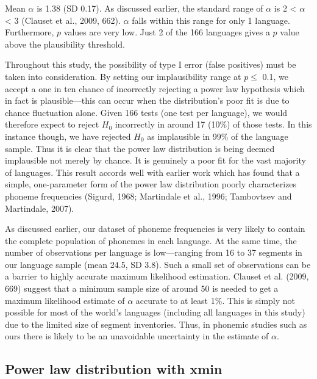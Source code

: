 Mean \(\alpha\) is 1.38 (SD 0.17). As discussed earlier, the standard range of \(\alpha\) is 2 \textless{} \(\alpha\) \textless{} 3 (Clauset et al., 2009, 662). \(\alpha\) falls within this range for only 1 language. Furthermore, \(p\) values are very low. Just 2 of the 166 languages gives a \(p\) value above the plausibility threshold.

Throughout this study, the possibility of type I error (false positives) must be taken into consideration. By setting our implausibility range at \(p \leq\) 0.1, we accept a one in ten chance of incorrectly rejecting a power law hypothesis which in fact is plausible---this can occur when the distribution's poor fit is due to chance fluctuation alone. Given 166 tests (one test per language), we would therefore expect to reject \(H_0\) incorrectly in around 17 (10\%) of those tests. In this instance though, we have rejected \(H_0\) as implausible in 99\% of the language sample. Thus it is clear that the power law distribution is being deemed implausible not merely by chance. It is genuinely a poor fit for the vast majority of languages. This result accords well with earlier work which has found that a simple, one-parameter form of the power law distribution poorly characterizes phoneme frequencies (Sigurd, 1968; Martindale et al., 1996; Tambovtsev and Martindale, 2007).

As discussed earlier, our dataset of phoneme frequencies is very likely to contain the complete population of phonemes in each language. At the same time, the number of observations per language is low---ranging from 16 to 37 segments in our language sample (mean 24.5, SD 3.8). Such a small set of observations can be a barrier to highly accurate maximum likelihood estimation. Clauset et al. (2009, 669) suggest that a minimum sample size of around 50 is needed to get a maximum likelihood estimate of \(\alpha\) accurate to at least 1\%. This is simply not possible for most of the world's languages (including all languages in this study) due to the limited size of segment inventories. Thus, in phonemic studies such as ours there is likely to be an unavoidable uncertainty in the estimate of \(\alpha\). \newline

\hypertarget{power-law-xmin-results}{%
\subsection*{Power law distribution with xmin}\label{power-law-xmin-results}}

